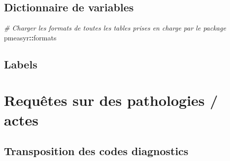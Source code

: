 \documentclass[]{book}
\newenvironment{Shaded}{\begin{snugshade}}{\end{snugshade}}
\newcommand{\CommentTok}[1]{\textcolor[rgb]{0.56,0.35,0.01}{\textit{#1}}}
\newcommand{\DataTypeTok}[1]{\textcolor[rgb]{0.13,0.29,0.53}{#1}}
\newcommand{\KeywordTok}[1]{\textcolor[rgb]{0.13,0.29,0.53}{\textbf{#1}}}
\newcommand{\NormalTok}[1]{#1}
\newcommand{\OperatorTok}[1]{\textcolor[rgb]{0.81,0.36,0.00}{\textbf{#1}}}
\begin{document}
\hypertarget{dictionnaire-de-variables}{%
\section{Dictionnaire de variables}\label{dictionnaire-de-variables}}

\begin{Shaded}
\end{Shaded}

\begin{Shaded}
\begin{Highlighting}[]
\CommentTok{# Charger les formats de toutes les tables prises en charge par le package}
\NormalTok{pmeasyr}\OperatorTok{::}\NormalTok{formats}
\end{Highlighting}
\end{Shaded}

\hypertarget{labels}{%
\section{Labels}\label{labels}}

\begin{Shaded}
\end{Shaded}

\hypertarget{requetes-sur-des-pathologies-actes}{%
\chapter{Requêtes sur des pathologies / actes}\label{requetes-sur-des-pathologies-actes}}

\hypertarget{transposition-des-codes-diagnostics}{%
\section{Transposition des codes diagnostics}\label{transposition-des-codes-diagnostics}}
\end{document}
